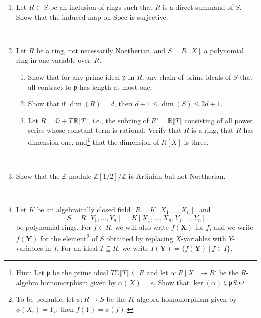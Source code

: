 \documentclass[12pt]{amsart}
\newcommand{\Q}{\mathbb{Q}}
\newcommand{\Z}{\mathbb{Z}}
\newcommand{\R}{\mathbb{R}}
\newcommand{\C}{\mathbb{C}}
\newcommand{\X}{\mathbf{X}}
\newcommand{\Y}{\mathbf{Y}}
\newcommand{\p}{\mathfrak{p}}
\newcommand{\Spec}{\mathrm{Spec}}
\begin{document}
\begin{enumerate}

\item Let $R\subset S$ be an inclusion of rings such that $R$ is a direct summand of $S$. Show that the induced map on $\Spec$ is surjective.

\



\item Let $R$ be a ring, not necessarily Noetherian, and $S=R[X]$ a polynomial ring in one variable over~$R$.
\begin{enumerate} 
\item Show that for any prime ideal $\p$ in $R$, any chain of prime ideals of $S$ that all contract to $\p$ has length at most one.
\item Show that if $\dim(R)=d$, then $d+1 \leq \dim(S) \leq 2d+1$.
\item Let $R= \Q + T \,\R \llbracket T \rrbracket$, i.e., the subring of $R' = \R \llbracket T \rrbracket$ consisting of all power series whose constant term is rational. Verify that $R$ is a ring, that $R$ has dimension one, and\footnote{Hint: Let $\p$ be the prime ideal $T\C \llbracket T \rrbracket\subseteq R$ and let  $\alpha:R[X]\to R'$ be the $R$-algebra homomorphism given by $\alpha(X)=e$. Show that $\ker(\alpha) \subsetneqq \p S$.} that the dimension of $R[X]$ is three.
\end{enumerate}



\



\item Show that the $\Z$-module $\Z[1/2]/\Z$ is Artinian but not Noetherian.

\


\item Let $K$ be an algebraically closed field, $R=K[X_1,\dots,X_n]$, and 
\[S=R[Y_1,\dots,Y_n]=K[X_1,\dots,X_n,Y_1,\dots,Y_n]\] be polynomial rings. For $f\in R$, we will also write $f(\X)$ for $f$, and we write $f(\Y)$ for the element\footnote{To be pedantic, let $\phi:R\to S$ be the $K$-algebra homomorphism given by $\phi(X_i)=Y_i$; then $f(Y)=\phi(f)$.} of $S$ obtained by replacing $X$-variables with $Y$-variables in $f$. For an ideal $I\subseteq R$, we write $I(\Y) = \{ f(\Y) \ | \ f\in I\}$.


\end{enumerate}
\end{document}
